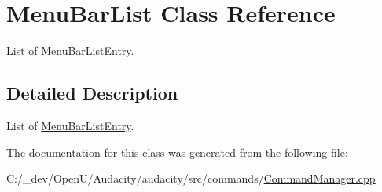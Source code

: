\hypertarget{class_menu_bar_list}{}\section{Menu\+Bar\+List Class Reference}
\label{class_menu_bar_list}


List of \hyperlink{struct_menu_bar_list_entry}{Menu\+Bar\+List\+Entry}.  




\subsection{Detailed Description}
List of \hyperlink{struct_menu_bar_list_entry}{Menu\+Bar\+List\+Entry}. 

The documentation for this class was generated from the following file\+:\begin{DoxyCompactItemize}
\item 
C\+:/\+\_\+dev/\+Open\+U/\+Audacity/audacity/src/commands/\hyperlink{_command_manager_8cpp}{Command\+Manager.\+cpp}\end{DoxyCompactItemize}
